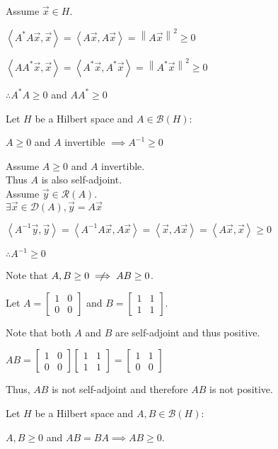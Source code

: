\documentclass[letterpaper,12pt,fleqn]{article}
\newcommand{\mb}{\mathcal{B}}
\newcommand{\md}{\mathcal{D}}
\newcommand{\mr}{\mathcal{R}}
\newcommand{\inner}[1]{\left<#1\right>}
\newcommand{\norm}[1]{\left\|#1\right\|}
\newcommand{\vx}{\vec{x}}
\newcommand{\vy}{\vec{y}}
\begin{document}
\begin{theproof}
  Assume $\vx\in H$.
  
  $\inner{A^*A\vx,\vx}=\inner{A\vx,A\vx}=\norm{A\vx}^2\ge0$
  
  $\inner{AA^*\vx,\vx}=\inner{A^*\vx,A^*\vx}=\norm{A^*\vx}^2\ge0$

  $\therefore A^*A\ge0$ and $AA^*\ge0$
\end{theproof}

\begin{theorem}
  Let $H$ be a Hilbert space and $A\in\mb(H)$:

  \qquad$A\ge0$ and $A$ invertible $\implies A^{-1}\ge0$
\end{theorem}

\begin{theproof}
  Assume $A\ge0$ and $A$ invertible. \\
  Thus $A$ is also self-adjoint. \\
  Assume $\vy\in\mr(A)$. \\
  $\exists\vx\in\md(A),\vy=A\vx$

  $\inner{A^{-1}\vy,\vy}=\inner{A^{-1}A\vx,A\vx}=\inner{\vx,A\vx}=
  \inner{A\vx,\vx}\ge0$

  $\therefore A^{-1}\ge0$
\end{theproof}

Note that $A,B\ge0\centernot{\implies}AB\ge0$.

\begin{example}
  Let $A=\begin{bmatrix} 1 & 0 \\ 0 & 0 \end{bmatrix}$ and
  $B=\begin{bmatrix} 1 & 1 \\ 1 & 1 \end{bmatrix}$.

  Note that both $A$ and $B$ are self-adjoint and thus positive.

  $AB=\begin{bmatrix} 1 & 0 \\ 0 & 0 \end{bmatrix}
  \begin{bmatrix} 1 & 1 \\ 1 & 1 \end{bmatrix}=
  \begin{bmatrix} 1 & 1 \\ 0 & 0 \end{bmatrix}$

  Thus, $AB$ is not self-adjoint and therefore $AB$ is not positive.
\end{example}

\begin{theorem}
  Let $H$ be a Hilbert space and $A,B\in\mb(H)$:

  \qquad$A,B\ge0$ and $AB=BA\implies AB\ge0$.
\end{theorem}
\end{document}
